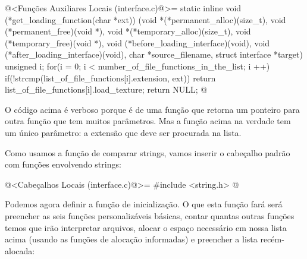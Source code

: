 \iniciocodigo
@<Funções Auxiliares Locais (interface.c)@>=
static inline void (*get_loading_function(char *ext))
                          (void *(*permanent_alloc)(size_t),
                           void (*permanent_free)(void *),
                           void *(*temporary_alloc)(size_t),
                           void (*temporary_free)(void *),
                           void (*before_loading_interface)(void),
                           void (*after_loading_interface)(void),
                           char *source_filename, struct interface *target){
  unsigned i;
  for(i = 0; i < number_of_file_functions_in_the_list; i ++){
    if(!strcmp(list_of_file_functions[i].extension, ext)){
      return list_of_file_functions[i].load_texture;
    }
  }
  return NULL;
}
@
\fimcodigo

O código acima é verboso porque é de uma função que retorna um
ponteiro para outra função que tem muitos parâmetros. Mas a função
acima na verdade tem um único parâmetro: a extensão que deve ser
procurada na lista.

Como usamos a função de comparar strings, vamos inserir o cabeçalho
padrão com funções envolvendo strings:

\iniciocodigo
@<Cabeçalhos Locais (interface.c)@>=
#include <string.h>
@
\fimcodigo

Podemos agora definir a função de inicialização. O que esta função
fará será preencher as seis funções personalizáveis básicas, contar
quantas outras funções temos que irão interpretar arquivos, alocar o
espaço necessário em nossa lista acima (usando as funções de alocação
informadas) e preencher a lista recém-alocada:

